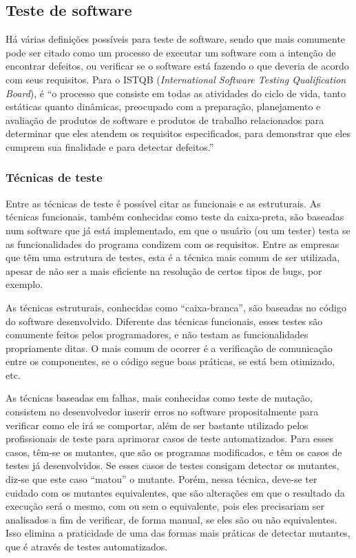 \documentclass[twoside,english,brazilian]{UNISINOSartigo}
\begin{document}
\subsection{Teste de software}

Há várias definições possíveis para teste de software, sendo que mais comumente pode ser citado como um processo de executar um software com a intenção de encontrar defeitos, ou verificar se o software está fazendo o que deveria de acordo com seus requisitos. Para o ISTQB (\textit{International Software Testing Qualification Board}), é ``o processo que consiste em todas as atividades do ciclo de vida, tanto estáticas quanto dinâmicas, preocupado com a preparação, planejamento e avaliação de produtos de software e produtos de trabalho relacionados para determinar que eles atendem os requisitos especificados, para demonstrar que eles cumprem sua finalidade e para detectar defeitos.'' \cite{ISTQBGlos12} %

\subsubsection{Técnicas de teste}
Entre as técnicas de teste é possível citar as funcionais e as estruturais. As técnicas funcionais, também conhecidas como teste da caixa-preta, são baseadas num software que já está implementado, em que o usuário (ou um tester) testa se as funcionalidades do programa condizem com os requisitos. Entre as empresas que têm uma estrutura de testes, esta é a técnica mais comum de ser utilizada, apesar de não ser a mais eficiente na resolução de certos tipos de bugs, por exemplo. 

As técnicas estruturais, conhecidas como ``caixa-branca'', são baseadas no código do software desenvolvido. Diferente das técnicas funcionais, esses testes são comumente feitos pelos programadores, e não testam as funcionalidades propriamente ditas. O mais comum de ocorrer é a verificação de comunicação entre os componentes, se o código segue boas práticas, se está bem otimizado, etc.  

As técnicas baseadas em falhas, mais conhecidas como teste de mutação, consistem no desenvolvedor inserir erros no software propositalmente para verificar como ele irá se comportar, além de ser bastante utilizado pelos profissionais de teste para aprimorar casos de teste automatizados. Para esses casos, têm-se os mutantes, que são os programas modificados, e têm os casos de testes já desenvolvidos. Se esses casos de testes consigam detectar os mutantes, diz-se que este caso ``matou'' o mutante. Porém, nessa técnica, deve-se ter cuidado com os mutantes equivalentes, que são alterações em que o resultado da execução será o mesmo, com ou sem o equivalente, pois eles precisariam ser analisados a fim de verificar, de forma manual, se eles são ou não equivalentes. Isso elimina a praticidade de uma das formas mais práticas de detectar mutantes, que é através de testes automatizados. 
\end{document}
